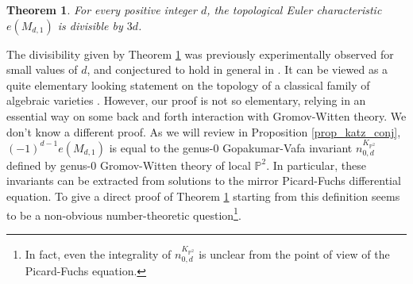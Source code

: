 \documentclass[11pt,letterpaper]{amsart}
\newtheorem{thm}[defn]{Theorem}
\newcommand\PP{\mathbb P}
\begin{document}
\begin{thm} \label{thm_divisibility_intro}
For every positive integer $d$, the topological Euler characteristic
$e(M_{d,1})$ is divisible by $3d$. 
\end{thm}

The divisibility given by Theorem \ref{thm_divisibility_intro} was previously experimentally observed for small values of $d$, and conjectured to hold in general in \cite{choi2018local}. 
It can be viewed as a quite elementary looking statement on the topology of a classical family of algebraic varieties \cite{MR1263210}. However, our proof is not so elementary, relying in an essential way on some back and forth interaction with Gromov-Witten theory. We don't know a different proof.
As we will review in Proposition \ref{prop_katz_conj}, $(-1)^{d-1}e(M_{d,1})$ is equal to the genus-$0$ Gopakumar-Vafa invariant $n_{0,d}^{K_{\PP^2}}$ defined by genus-$0$ Gromov-Witten theory of local $\PP^2$. In particular, these invariants can be extracted from solutions to the mirror Picard-Fuchs 
differential equation. To give a direct proof of Theorem  
\ref{thm_divisibility_intro} starting from this definition
seems to be a non-obvious number-theoretic question\footnote{In fact, even the integrality of $n_{0,d}^{K_{\PP^2}}$ is unclear from the point of view of the Picard-Fuchs equation.}. 
\end{document}

